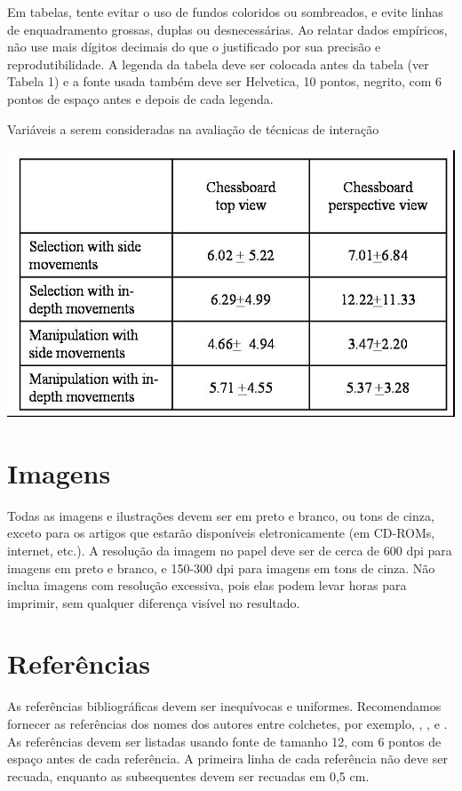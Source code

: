 \documentclass[12pt]{article}
\begin{document}
Em tabelas, tente evitar o uso de fundos coloridos ou sombreados, e evite
linhas de enquadramento grossas, duplas ou desnecessárias. Ao relatar dados empíricos,
não use mais dígitos decimais do que o justificado por sua precisão e
reprodutibilidade. A legenda da tabela deve ser colocada antes da tabela (ver Tabela 1)
e a fonte usada também deve ser Helvetica, 10 pontos, negrito, com 6 pontos de
espaço antes e depois de cada legenda.

\begin{table}[ht]
\centering
\caption{Variáveis a serem consideradas na avaliação de técnicas de
interação}
\label{tab:exTable1}
\includegraphics[width=.7\textwidth]{table.jpg}
\end{table}

\section{Imagens}

Todas as imagens e ilustrações devem ser em preto e branco, ou tons de cinza,
exceto para os artigos que estarão disponíveis eletronicamente (em CD-ROMs,
internet, etc.). A resolução da imagem no papel deve ser de cerca de 600 dpi para
imagens em preto e branco, e 150-300 dpi para imagens em tons de cinza. Não inclua
imagens com resolução excessiva, pois elas podem levar horas para imprimir, sem qualquer
diferença visível no resultado.

\section{Referências}

As referências bibliográficas devem ser inequívocas e uniformes. Recomendamos fornecer
as referências dos nomes dos autores entre colchetes, por exemplo, \cite{knuth:84},
\cite{boulic:91}, e \cite{smith:99}. As referências devem ser listadas usando fonte de tamanho 12, com 6 pontos de espaço
antes de cada referência. A primeira linha de cada referência não deve ser
recuada, enquanto as subsequentes devem ser recuadas em 0,5 cm.



\end{document}
